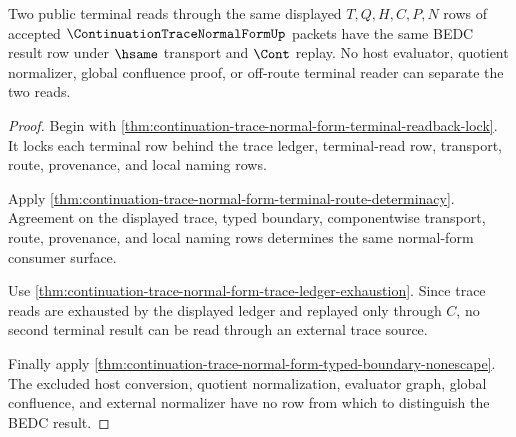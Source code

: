 \begin{theorem}
\label{thm:continuation-trace-normal-form-terminal-result-determinacy}
Two public terminal reads through the same displayed $T,Q,H,C,P,N$ rows of accepted $\ContinuationTraceNormalFormUp$ packets have the same BEDC result row under $\hsame$ transport and $\Cont$ replay. No host evaluator, quotient normalizer, global confluence proof, or off-route terminal reader can separate the two reads.
\end{theorem}
\begin{proof}
Begin with \autoref{thm:continuation-trace-normal-form-terminal-readback-lock}. It locks each terminal row behind the trace ledger, terminal-read row, transport, route, provenance, and local naming rows.

Apply \autoref{thm:continuation-trace-normal-form-terminal-route-determinacy}. Agreement on the displayed trace, typed boundary, componentwise transport, route, provenance, and local naming rows determines the same normal-form consumer surface.

Use \autoref{thm:continuation-trace-normal-form-trace-ledger-exhaustion}. Since trace reads are exhausted by the displayed ledger and replayed only through $C$, no second terminal result can be read through an external trace source.

Finally apply \autoref{thm:continuation-trace-normal-form-typed-boundary-nonescape}. The excluded host conversion, quotient normalization, evaluator graph, global confluence, and external normalizer have no row from which to distinguish the BEDC result.
\end{proof}


